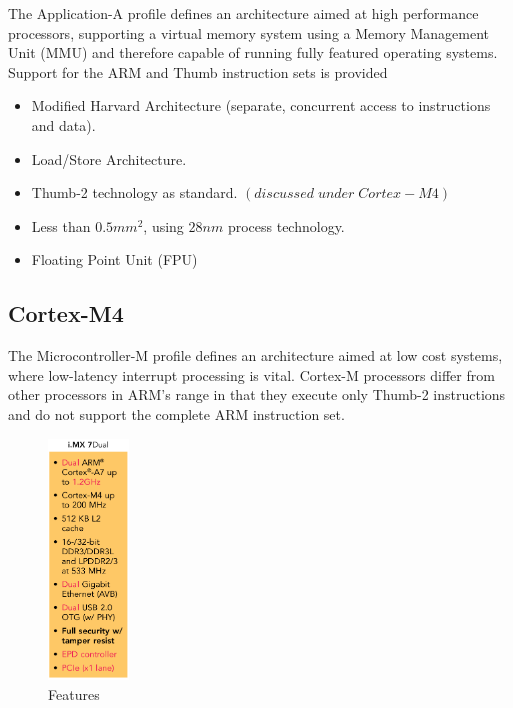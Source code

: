 \documentclass{article}
\begin{document}
The Application-A profile defines an architecture aimed at high performance
processors, supporting a virtual memory system using a Memory Management
Unit (MMU) and therefore capable of running fully featured operating systems.
Support for the ARM and Thumb instruction sets is provided

\begin{itemize}
    \item Modified Harvard Architecture (separate, concurrent access to instructions and data).
    \item Load/Store Architecture.
    \item Thumb-2 technology as standard. \((discussed\; under\; Cortex-M4)\)
    \item Less than \(0.5mm^2\), using \(28nm\) process technology.
    \item Floating Point Unit (FPU)
  \end{itemize}

\newpage
\subsection{Cortex-M4} \label{subsection:Cortex-M4}

The Microcontroller-M profile defines an architecture aimed at low cost systems,
where low-latency interrupt processing is vital. Cortex-M processors differ from other processors in
ARM’s range in that they execute only Thumb-2 instructions and do not support the complete ARM
instruction set.
\begin{figure}
    \begin{center}
      \includegraphics[width=0.19\textwidth]{features}
    \end{center}
    \caption{Features}
\end{figure}
\end{document}
